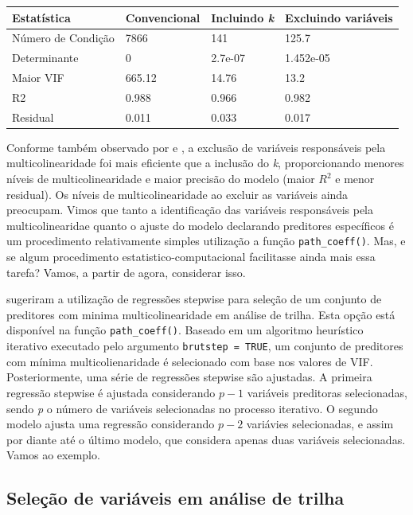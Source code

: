 \documentclass[
]{book}
\begin{document}
\begin{longtable}[]{@{}llll@{}}
\toprule
Estatística & Convencional & Incluindo \emph{k} & Excluindo variáveis\tabularnewline
\midrule
\endhead
Número de Condição & 7866 & 141 & 125.7\tabularnewline
Determinante & 0 & 2.7e-07 & 1.452e-05\tabularnewline
Maior VIF & 665.12 & 14.76 & 13.2\tabularnewline
R2 & 0.988 & 0.966 & 0.982\tabularnewline
Residual & 0.011 & 0.033 & 0.017\tabularnewline
\bottomrule
\end{longtable}

Conforme também observado por \citet{Hoerl1970} e \citet{Olivoto2017f}, a exclusão de variáveis responsáveis pela multicolinearidade  foi mais eficiente que a inclusão do \emph{k}, proporcionando menores níveis de multicolinearidade e maior precisão do modelo (maior \(R^2\) e menor residual). Os níveis de multicolinearidade ao excluir as variáveis ainda preocupam. Vimos que tanto a identificação das variáveis responsáveis pela multicolinearidae quanto o ajuste do modelo declarando preditores específicos é um procedimento relativamente simples utilização a função \texttt{path\_coeff()}. Mas, e se algum procedimento estatistico-computacional facilitasse ainda mais essa tarefa? Vamos, a partir de agora, considerar isso.

\citet{Olivoto2017} sugeriram a utilização de regressões stepwise para seleção de um conjunto de preditores com minima multicolinearidade em análise de trilha. Esta opção está disponível na função \texttt{path\_coeff()}. Baseado em um algoritmo heurístico iterativo executado pelo argumento \texttt{brutstep\ =\ TRUE}, um conjunto de preditores com mínima multicolienaridade é selecionado com base nos valores de VIF. Posteriormente, uma série de regressões stepwise são ajustadas. A primeira regressão stepwise é ajustada considerando \(p-1\) variáveis preditoras selecionadas, sendo \emph{p} o número de variáveis selecionadas no processo iterativo. O segundo modelo ajusta uma regressão considerando \(p-2\) variávies selecionadas, e assim por diante até o último modelo, que considera apenas duas variáveis selecionadas. Vamos ao exemplo.

\hypertarget{seleuxe7uxe3o-de-variuxe1veis-em-anuxe1lise-de-trilha}{%
\subsection{Seleção de variáveis em análise de trilha}\label{seleuxe7uxe3o-de-variuxe1veis-em-anuxe1lise-de-trilha}}
\end{document}
